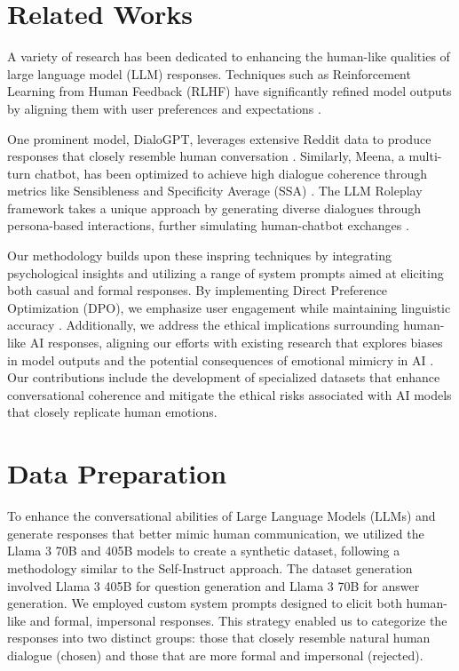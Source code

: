 \documentclass{article}
\begin{document}
\section{Related Works}
A variety of research has been dedicated to enhancing the human-like qualities of large language model (LLM) responses. Techniques such as Reinforcement Learning from Human Feedback (RLHF) have significantly refined model outputs by aligning them with user preferences and expectations \cite{li2023reinforcementlearninghumanfeedback}. 

One prominent model, DialoGPT, leverages extensive Reddit data to produce responses that closely resemble human conversation \cite{zhang2020dialogptlargescalegenerativepretraining}. Similarly, Meena, a multi-turn chatbot, has been optimized to achieve high dialogue coherence through metrics like Sensibleness and Specificity Average (SSA) \cite{adiwardana2020humanlikeopendomainchatbot}. The LLM Roleplay framework takes a unique approach by generating diverse dialogues through persona-based interactions, further simulating human-chatbot exchanges \cite{tamoyan2024llmroleplaysimulatinghumanchatbot}.

Our methodology builds upon these inspring techniques by integrating psychological insights and utilizing a range of system prompts aimed at eliciting both casual and formal responses. By implementing Direct Preference Optimization (DPO), we emphasize user engagement while maintaining linguistic accuracy \cite{rafailov2024directpreferenceoptimizationlanguage}. Additionally, we address the ethical implications surrounding human-like AI responses, aligning our efforts with existing research that explores biases in model outputs and the potential consequences of emotional mimicry in AI \cite{weidinger2022taxonomy}. Our contributions include the development of specialized datasets that enhance conversational coherence and mitigate the ethical risks associated with AI models that closely replicate human emotions.



\section{Data Preparation}
\label{sec:data_preparation}
To enhance the conversational abilities of Large Language Models (LLMs) and generate responses that better mimic human communication, we utilized the Llama 3 70B and 405B models to create a synthetic dataset, following a methodology similar to the Self-Instruct \cite{wang2023selfinstructaligninglanguagemodels} approach. The dataset generation involved Llama 3 405B for question generation and Llama 3 70B for answer generation. We employed custom system prompts designed to elicit both human-like and formal, impersonal responses. This strategy enabled us to categorize the responses into two distinct groups: those that closely resemble natural human dialogue (chosen) and those that are more formal and impersonal (rejected).
\end{document}
